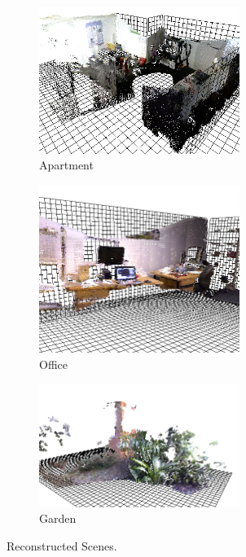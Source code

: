 \begin{figure}[!h] 
        \centering
        \begin{subfigure}[b]{6.8cm}
                \includegraphics[width=6.5cm]{images/ch2/unit21}
                \caption{Apartment}
                \label{fig:RECON_UNIT}
        \end{subfigure}%
        \begin{subfigure}[b]{6.8cm}
                \includegraphics[width=6.5cm]{images/ch2/officeA}
                \caption{Office}
                \label{fig:RECON_OFFICE}
        \end{subfigure}
        \begin{subfigure}[b]{6.8cm}
                \includegraphics[width=6.5cm]{images/ch2/outdoorA}
                \caption{Garden}
                \label{fig:RECON_GARDEN}
        \end{subfigure}
       \caption{Reconstructed Scenes.}
       \label{fig:RECONSTRUCTIONS}
\end{figure}


